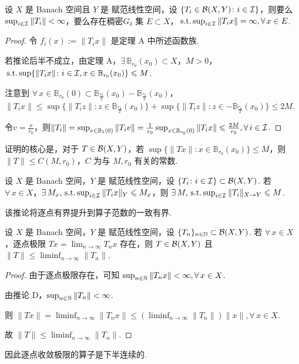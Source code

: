 \begin{corollary}[C]
    设 $X$ 是 Banach 空间且 $Y$ 是 赋范线性空间，设 $\{T_i \in \mathcal{B}(X, Y) \colon i \in \mathcal{I}\}$，则要么 $\sup_{i \in \mathcal{I}} \|T_i\| < \infty$，要么存在稠密$G_\delta$ 集 $E \subset X$，$\operatorname{\,\text{s.t.}} \sup_{i \in \mathcal{I}} \|T_ix\| = \infty, \forall\, x \in E$.
\end{corollary}
\begin{proof}
    令 $f_i(x) := \|T_ix\|$ 是定理 A 中所述函数族.\par
    若推论后半不成立，由定理 A，$\exists\, \mathbb{B}_{r_0}(x_0) \subset X$，$M > 0$，$\operatorname{\,\text{s.t.}} \sup\{\|T_i x\| \colon i \in \mathcal{I}, x \in \mathbb{B}_{r_0}(x_0)\} \leqslant M$.\par
    注意到 $\forall\, x \in \mathbb{B}_{r_0}(0) \subset \mathbb{B}_{\tfrac{r_0}{2}}(x_0) - \mathbb{B}_{\tfrac{r_0}{2}}(x_0)$，$\|T_i x\| \leq \sup\{\|T_i z\| \colon z \in \mathbb{B}_{\tfrac{r_0}{2}}(x_0)\} + \sup\{\|T_i z\| \colon z \in -\mathbb{B}_{\tfrac{r_0}{2}}(x_0)\} \leq 2M$.\par
    令$v=\frac{x}{r_0}$，则$\|T_i\| = \sup_{v \in \mathbb{B}_1(0)} \|T_i v\| = \frac{1}{r_0}\sup_{x \in \mathbb{B}_{r_0}(0)} \|T_i x\| \leqslant \frac{2M}{r_0},\forall\, i\in\mathcal{I}$.
\end{proof}
证明的核心是，对于 $T \in \mathcal{B}(X, Y)$，若 $\sup\{\|Tx\| \colon x \in \mathbb{B}_{r_0}(x_0)\} \leq M$，则 $\|T\| \leq C(M, r_0)$，$C$ 为与 $M, r_0$ 有关的常数.

\begin{corollary}[D, 一致有界原理]
    设 $X$ 是 Banach 空间，$Y$ 是 赋范线性空间，设 $\{T_i \colon i \in \mathcal{I}\} \subset \mathcal{B}(X, Y)$. 若 $\forall\, x\in X$，$\exists\,M_x,\operatorname{\,\text{s.t.}}\allowbreak\sup_{i \in \mathcal{I}} \|T_i x\|_Y \leqslant M_x$，则 $\exists\, M, \operatorname{\,\text{s.t.}} \sup_{i \in \mathcal{I}} \|T_i\|_{X \to Y} \leqslant M$.
\end{corollary}
该推论将逐点有界提升到算子范数的一致有界.

\begin{corollary}[E]
    设 $X$ 是 Banach 空间，$Y$ 是 赋范线性空间，设 $\{T_n\}_{n \in \mathbb{N}} \subset \mathcal{B}(X, Y)$. 若 $\forall\, x \in X$，逐点极限 $Tx = \lim_{n \to \infty} T_nx$ 存在，则 $T \in \mathcal{B}(X, Y)$ 且 $\|T\| \leq \liminf_{n \to \infty} \|T_n\|$.
\end{corollary}
\begin{proof}
    由于逐点极限存在，可知 $\sup_{n \in \mathbb{N}} \|T_n x\| < \infty, \forall\, x \in X$.\par
    由推论 D，$\sup_{n \in \mathbb{N}} \|T_n\| < \infty$.\par
    则 $\|Tx\| = \liminf_{n \to \infty} \|T_n x\| \leq \left(\liminf_{n \to \infty} \|T_n\|\right) \|x\|, \forall\, x \in X$.\par
    故 $\|T\| \leq \liminf_{n \to \infty} \|T_n\|$.
\end{proof}
因此逐点收敛极限的算子是下半连续的.